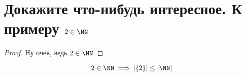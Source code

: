 

\section{Докажите что-нибудь интересное. К примеру $2 \in \NN$}

\begin{proof}
    Ну очев, ведь $2 \in \NN$
\end{proof}

\[ 2 \in \NN \implies \left| \left\{ 2 \right\} \right| \leq \left| \NN \right|  \]

